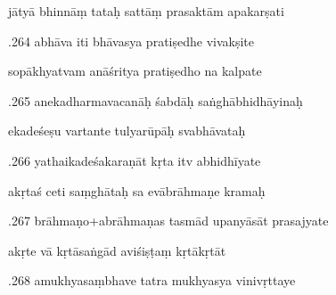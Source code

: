 \documentclass[article,12pt,a4paper]{memoir}%
\newcounter{parCount}
\begin{document}
	  
	  \pstart \leavevmode%
	jātyā bhinnāṃ tataḥ sattāṃ prasaktām apakarṣati 
	{}
	\pend%
      

	  
	  \pstart {}.264 abhāva iti bhāvasya pratiṣedhe vivakṣite 
	{}
	\pend%
      

	  
	  \pstart \leavevmode%
	sopākhyatvam anāśritya pratiṣedho na kalpate 
	{}
	\pend%
      

	  
	  \pstart {}.265 anekadharmavacanāḥ śabdāḥ saṅghābhidhāyinaḥ 
	{}
	\pend%
      

	  
	  \pstart \leavevmode%
	ekadeśeṣu vartante tulyarūpāḥ svabhāvataḥ 
	{}
	\pend%
      

	  
	  \pstart {}.266 yathaikadeśakaraṇāt kṛta itv abhidhīyate 
	{}
	\pend%
      

	  
	  \pstart \leavevmode%
	akṛtaś ceti saṃghātaḥ sa evābrāhmaṇe kramaḥ 
	{}
	\pend%
      

	  
	  \pstart {}.267 brāhmaṇo+abrāhmaṇas tasmād upanyāsāt prasajyate 
	{}
	\pend%
      

	  
	  \pstart \leavevmode%
	akṛte vā kṛtāsaṅgād aviśiṣṭaṃ kṛtākṛtāt 
	{}
	\pend%
      

	  
	  \pstart {}.268 amukhyasaṃbhave tatra mukhyasya vinivṛttaye 
	{}
	\pend%
      
\end{document}
